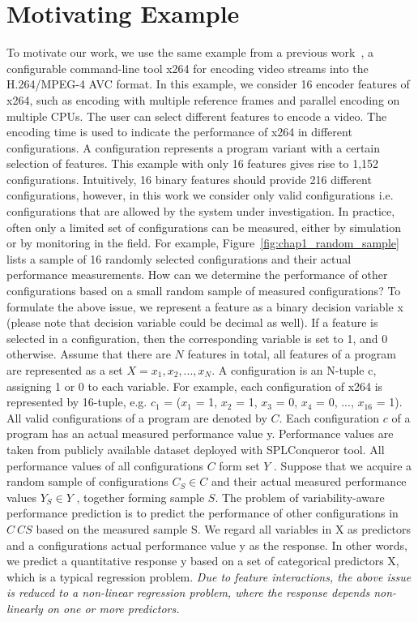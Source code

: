 \section{Motivating Example}
To motivate our work, we use the same example from a previous work~\cite{guo2013variability}, a configurable
command-line tool x264 for encoding video streams into the H.264/MPEG-4 AVC format.
In this example, we consider 16 encoder features of x264, such as encoding with multiple
reference frames and parallel encoding on multiple CPUs. The user can select
different features to encode a video. The encoding time is used to indicate the performance
of x264 in different configurations. A configuration represents a program variant with
a certain selection of features. This example with only 16 features gives rise to 1,152
configurations. Intuitively, 16 binary features should provide 216 different configurations,
however, in this work we consider only valid configurations i.e. configurations that are
allowed by the system under investigation.
In practice, often only a limited set of configurations can be measured, either by simulation
or by monitoring in the field. For example, Figure~\ref{fig:chap1_random_sample} lists a sample of 16 randomly selected
configurations and their actual performance measurements. How can we determine
the performance of other configurations based on a small random sample of measured configurations?
To formulate the above issue, we represent a feature as a binary decision variable x (please note that decision variable could be decimal as well).
If a feature is selected in a configuration, then the corresponding variable is set to 1, and
0 otherwise. Assume that there are $N$ features in total, all features of a program are
represented as a set $X = {x_1, x_2, ..., x_N}$. A configuration is an N-tuple c, assigning 1 or 0
to each variable. For example, each configuration of x264 is represented by 16-tuple, e.g.
$c_1$ = ($x_1$ = 1, $x_2$ = 1, $x_3$ = 0, $x_4$ = 0, ..., $x_{16}$ = 1). All valid configurations of a program are
denoted by $C$.
Each configuration $c$ of a program has an actual measured performance value y. Performance values are taken from publicly available dataset deployed with SPLConqueror
tool.
All performance values of all configurations $C$ form set $Y$ . Suppose that we acquire a
random sample of configurations $C_S \in C$ and their actual measured performance values
$Y_S \in Y$ , together forming sample $S$. The problem of variability-aware performance prediction
is to predict the performance of other configurations in $C \ CS$ based on the measured
sample S.
We regard all variables in X as predictors and a configuration\textquotesingle s actual performance
value y as the response. In other words, we predict a quantitative response y based on a
set of categorical predictors X, which is a typical regression problem. \textit{Due to feature
interactions, the above issue is reduced to a non-linear regression problem, where the
response depends non-linearly on one or more predictors.}




